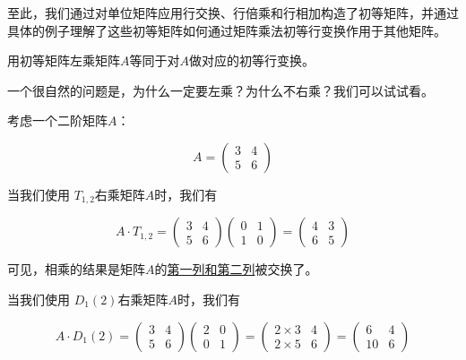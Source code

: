 至此，我们通过对单位矩阵应用行交换、行倍乘和行相加构造了初等矩阵，并通过具体的例子理解了这些初等矩阵如何通过矩阵乘法初等行变换作用于其他矩阵。

\vspace{0.2cm}

\begin{note}
    用初等矩阵左乘矩阵$A$等同于对$A$做对应的初等行变换。
\end{note}

\vspace{0.2cm}

一个很自然的问题是，为什么一定要左乘？为什么不右乘？我们可以试试看。

\begin{exercise}
考虑一个二阶矩阵\(A\)：

\[ A = \begin{pmatrix} 3 & 4 \\ 5 & 6 \end{pmatrix} \]

当我们使用 $T_{1,2} $右乘矩阵\(A\)时，我们有

\[ A \cdot T_{1,2} = \begin{pmatrix} 3 & 4 \\ 5 & 6 \end{pmatrix} \begin{pmatrix} 0 & 1 \\ 1 & 0 \end{pmatrix} = \begin{pmatrix} 4 & 3 \\ 6 & 5 \end{pmatrix} \]

可见，相乘的结果是矩阵\(A\)的\underline{第一列和第二列}被交换了。

当我们使用 $D_{1}(2) $右乘矩阵\(A\)时，我们有

\[ A \cdot D_{1}(2) = \begin{pmatrix} 3 & 4 \\ 5 & 6 \end{pmatrix} \begin{pmatrix} 2 & 0 \\ 0 & 1 \end{pmatrix} = \begin{pmatrix} 2 \times 3 & 4 \\ 2 \times 5 & 6 \end{pmatrix} = \begin{pmatrix} 6 & 4 \\ 10 & 6 \end{pmatrix} \]


\end{exercise}
